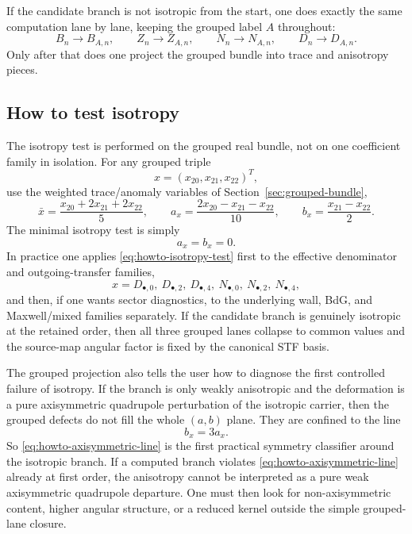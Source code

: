 \documentclass[11pt]{article}
\theoremstyle{definition}
\begin{document}
If the candidate branch is not isotropic from the start, one does exactly the same computation lane by lane, keeping the grouped label $A$ throughout:
\[
B_n\to B_{A,n},\qquad Z_n\to Z_{A,n},\qquad N_n\to N_{A,n},\qquad D_n\to D_{A,n}.
\]
Only after that does one project the grouped bundle into trace and anisotropy pieces.

\subsection{How to test isotropy}

The isotropy test is performed on the grouped real bundle, not on one coefficient family in isolation. For any grouped triple
\[
 x=(x_{20},x_{21},x_{22})^T,
\]
use the weighted trace/anomaly variables of Section~\ref{sec:grouped-bundle},
\begin{equation}
 \bar x=\frac{x_{20}+2x_{21}+2x_{22}}{5},
 \qquad
 a_x=\frac{2x_{20}-x_{21}-x_{22}}{10},
 \qquad
 b_x=\frac{x_{21}-x_{22}}{2}.
 \label{eq:howto-grouped-triple}
\end{equation}
The minimal isotropy test is simply
\begin{equation}
 a_x=b_x=0.
 \label{eq:howto-isotropy-test}
\end{equation}
In practice one applies \eqref{eq:howto-isotropy-test} first to the effective denominator and outgoing-transfer families,
\[
 x=D_{\bullet,0},\ D_{\bullet,2},\ D_{\bullet,4},\ N_{\bullet,0},\ N_{\bullet,2},\ N_{\bullet,4},
\]
and then, if one wants sector diagnostics, to the underlying wall, BdG, and Maxwell/mixed families separately. If the candidate branch is genuinely isotropic at the retained order, then all three grouped lanes collapse to common values and the source-map angular factor is fixed by the canonical STF basis.

The grouped projection also tells the user how to diagnose the first controlled failure of isotropy. If the branch is only weakly anisotropic and the deformation is a pure axisymmetric quadrupole perturbation of the isotropic carrier, then the grouped defects do not fill the whole $(a,b)$ plane. They are confined to the line
\begin{equation}
 b_x=3a_x.
 \label{eq:howto-axisymmetric-line}
\end{equation}
So \eqref{eq:howto-axisymmetric-line} is the first practical symmetry classifier around the isotropic branch. If a computed branch violates \eqref{eq:howto-axisymmetric-line} already at first order, the anisotropy cannot be interpreted as a pure weak axisymmetric quadrupole departure. One must then look for non-axisymmetric content, higher angular structure, or a reduced kernel outside the simple grouped-lane closure.
\end{document}
